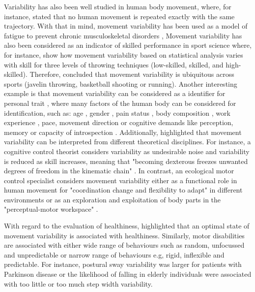 Variability has also been well studied in human body movement, where, for instance, 
\cite{bernstein1967} stated that no human movement is repeated exactly 
with the same trajectory.
With that in mind, movement variability has been used as a model of fatigue to prevent 
chronic musculoskeletal disorders \citep{mathiassen2006, srinivasan2012},
Movement variability has also been considered as an indicator of skilled performance
in sport science where, for instance, \cite{wagner2012} show how movement variability 
based on statistical analysis varies with skill for three levels of 
throwing techniques (low-skilled, skilled, and high-skilled).
Therefore, \cite{bartlett2007} concluded that movement variability is ubiquitous across sports 
(javelin throwing, basketball shooting or running).
Another interesting example is that movement variability can be considered as a 
identifier for personal trait \citep{sandlund2017}, 
where many factors of the human body can be considered for identification, such as:
age \citep{kruger2013, macdonald2006, vaillancourt2003, stergiou2016},
gender \citep{svendsen2010},
pain status \citep{madeleine2008, sandlund2008},
body composition  \citep{chiari2002},
work experience \citep{madeleine2009},
pace, movement direction or cognitive demands  
like perception, memory or capacity of introspection \citep{srinivasan2012, kanai2011}.
Additionally, \cite{bartlett2007} highlighted that movement variability can be 
interpreted from different theoretical disciplines.
For instance, a cognitive control theorist considers variability as undesirable noise and 
variability is reduced as skill increases, meaning that 
"becoming dexterous freezes unwanted degrees of freedom in the kinematic chain" \citep[p. 238]{bartlett2007}.
In contrast, an ecological motor control specialist considers movement variability 
either as a functional role in human movement for "coordination change and flexibility to adapt" 
in different environments \citep[p. 238]{bartlett2007} or 
as an exploration and exploitation of body parts in the "perceptual-motor workspace" \citep{wu2014, herzfeld2014}.

With regard to the evaluation of healthiness, \cite{stergiou2011} highlighted that 
an optimal state of movement variability is associated with healthiness. 
Similarly, motor disabilities are associated with either wide range of behaviours 
such as random, unfocussed and unpredictable or narrow range of behaviours e.g, 
rigid, inflexible and predictable. For instance, postural sway variability was larger 
for patients with Parkinson disease or the likelihood of falling in elderly individuals 
were associated with too little or too much step width variability.



